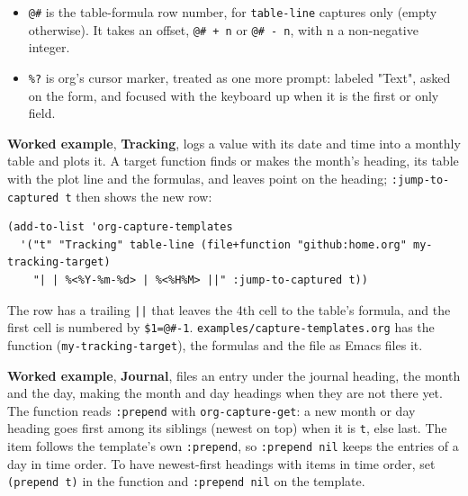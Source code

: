 \documentclass[11pt]{article}
\begin{document}
\begin{itemize}
\item \texttt{@\#} is the table-formula row number, for \texttt{table-line} captures only (empty otherwise). It takes an offset, \texttt{@\# + n} or \texttt{@\# - n}, with n a non-negative integer.
\item \texttt{\%?} is org's cursor marker, treated as one more prompt: labeled "Text", asked on the form, and focused with the keyboard up when it is the first or only field.
\end{itemize}

\textbf{Worked example}, \textbf{Tracking}, logs a value with its date and time into a monthly table and plots it. A target function finds or makes the month's heading, its table with the plot line and the formulas, and leaves point on the heading; \texttt{:jump-to-captured t} then shows the new row:

\begin{verbatim}
(add-to-list 'org-capture-templates
  '("t" "Tracking" table-line (file+function "github:home.org" my-tracking-target)
    "| | %<%Y-%m-%d> | %<%H%M> ||" :jump-to-captured t))
\end{verbatim}

The row has a trailing \texttt{||} that leaves the 4th cell to the table's formula, and the first cell is numbered by \texttt{\$1=@\#-1}. \texttt{examples/capture-templates.org} has the function (\texttt{my-tracking-target}), the formulas and the file as Emacs files it.

\textbf{Worked example}, \textbf{Journal}, files an entry under the journal heading, the month and the day, making the month and day headings when they are not there yet. The function reads \texttt{:prepend} with \texttt{org-capture-get}: a new month or day heading goes first among its siblings (newest on top) when it is \texttt{t}, else last. The item follows the template's own \texttt{:prepend}, so \texttt{:prepend nil} keeps the entries of a day in time order. To have newest-first headings with items in time order, set \texttt{(prepend t)} in the function and \texttt{:prepend nil} on the template.
\end{document}
